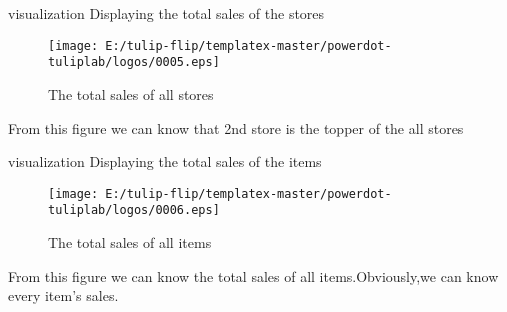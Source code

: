 \documentclass[
 size=12pt,
 paper=smartboard, %
 mode=present, %
 display=slides, %
style=tuliplab,
pauseslide,
fleqn,leqno]{powerdot}
\begin{document}
\begin{slide}[toc=,bm=]{visualization}
  Displaying the total sales of the stores
  \begin{figure}[ht]%
    \centering%
    \texttt{[image: E:/tulip-flip/templatex-master/powerdot-tuliplab/logos/0005.eps]}
    \caption{The total sales of all stores}%
    \end{figure}
    \vspace{0.5cm}
    From this figure we can know that 2nd store is the topper of the all stores
  \end{slide}


\begin{slide}[toc=,bm=]{visualization}
  Displaying the total sales of the items
  \vspace{0.8cm} 
  \begin{figure}[ht]%
    \centering%
    \texttt{[image: E:/tulip-flip/templatex-master/powerdot-tuliplab/logos/0006.eps]}
    \caption{The total sales of all items}%
    \end{figure}
    \vspace{0.3cm}
    From this figure we can know the total sales of all items.Obviously,we can know every item's sales.
  \end{slide}


\end{document}
